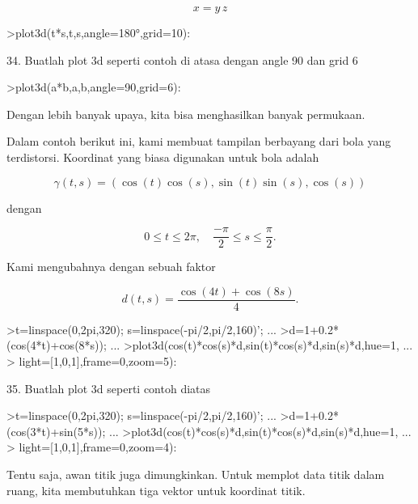 \documentclass[a4paper,10pt]{article}
\begin{document}
\begin{eulernotebook}
\begin{eulercomment}
\end{eulercomment}
\begin{eulerformula}
\[
x = y \, z
\]
\end{eulerformula}
\begin{eulerprompt}
>plot3d(t*s,t,s,angle=180°,grid=10):
\end{eulerprompt}
\begin{eulercomment}
34. Buatlah plot 3d seperti contoh di atasa dengan angle 90 dan grid 6
\end{eulercomment}
\begin{eulerprompt}
>plot3d(a*b,a,b,angle=90,grid=6):
\end{eulerprompt}
\begin{eulercomment}
Dengan lebih banyak upaya, kita bisa menghasilkan banyak permukaan.

Dalam contoh berikut ini, kami membuat tampilan berbayang dari bola
yang terdistorsi. Koordinat yang biasa digunakan untuk bola adalah

\end{eulercomment}
\begin{eulerformula}
\[
\gamma(t,s) = (\cos(t)\cos(s),\sin(t)\sin(s),\cos(s))
\]
\end{eulerformula}
\begin{eulercomment}
dengan

\end{eulercomment}
\begin{eulerformula}
\[
0 \le t \le 2\pi, \quad \frac{-\pi}{2} \le s \le \frac{\pi}{2}.
\]
\end{eulerformula}
\begin{eulercomment}
Kami mengubahnya dengan sebuah faktor

\end{eulercomment}
\begin{eulerformula}
\[
d(t,s) = \frac{\cos(4t)+\cos(8s)}{4}.
\]
\end{eulerformula}
\begin{eulerprompt}
>t=linspace(0,2pi,320); s=linspace(-pi/2,pi/2,160)'; ...
>d=1+0.2*(cos(4*t)+cos(8*s)); ...
>plot3d(cos(t)*cos(s)*d,sin(t)*cos(s)*d,sin(s)*d,hue=1, ...
>  light=[1,0,1],frame=0,zoom=5):
\end{eulerprompt}
\begin{eulercomment}
35. Buatlah plot 3d seperti contoh diatas
\end{eulercomment}
\begin{eulerprompt}
>t=linspace(0,2pi,320); s=linspace(-pi/2,pi/2,160)'; ...
>d=1+0.2*(cos(3*t)+sin(5*s)); ...
>plot3d(cos(t)*cos(s)*d,sin(t)*cos(s)*d,sin(s)*d,hue=1, ...
>  light=[1,0,1],frame=0,zoom=4): 
\end{eulerprompt}
\begin{eulercomment}
Tentu saja, awan titik juga dimungkinkan. Untuk memplot data titik
dalam ruang, kita membutuhkan tiga vektor untuk koordinat titik.


\end{eulercomment}
\end{eulernotebook}
\end{document}
